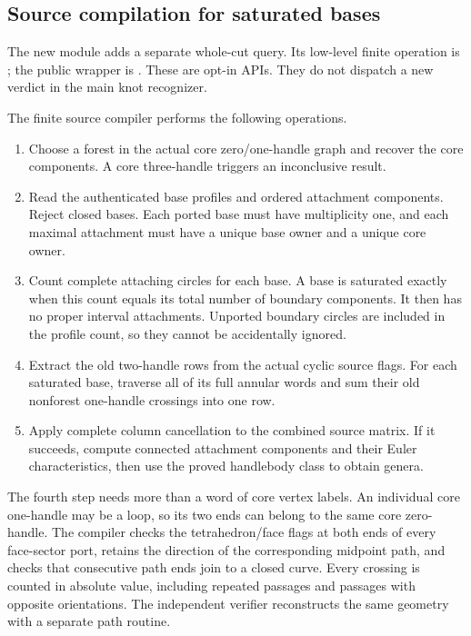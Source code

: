 \subsection{Source compilation for saturated bases}

The new  module adds a separate whole-cut query.
Its low-level finite operation is ; the public
wrapper is . These are opt-in APIs. They do not
dispatch a new verdict in the main knot recognizer.

The finite source compiler performs the following operations.
\begin{enumerate}
\item Choose a forest in the actual core zero/one-handle graph and recover
the core components. A core three-handle triggers an inconclusive result.
\item Read the authenticated base profiles and ordered attachment components.
Reject closed bases. Each ported base must have multiplicity one, and each
maximal attachment must have a unique base owner and a unique core owner.
\item Count complete attaching circles for each base. A base is saturated
exactly when this count equals its total number of boundary components.
It then has no proper interval attachments. Unported boundary circles are
included in the profile count, so they cannot be accidentally ignored.
\item Extract the old two-handle rows from the actual cyclic source flags.
For each saturated base, traverse all of its full annular words and sum
their old nonforest one-handle crossings into one row.
\item Apply complete column cancellation to the combined source matrix.
If it succeeds, compute connected attachment components and their Euler
characteristics, then use the proved handlebody class to obtain genera.
\end{enumerate}

The fourth step needs more than a word of core vertex labels. An individual
core one-handle may be a loop, so its two ends can belong to the same core
zero-handle. The compiler checks the tetrahedron/face flags at both ends
of every face-sector port, retains the direction of the corresponding
midpoint path, and checks that consecutive path ends join to a closed
curve. Every crossing is counted in absolute value, including repeated
passages and passages with opposite orientations. The independent verifier
reconstructs the same geometry with a separate path routine.

